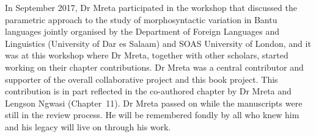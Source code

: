 \documentclass[output=paper]{langscibook}
\begin{document}
In  {September 2017}, Dr Mreta participated in the workshop that discussed the parametric approach to the study of morphosyntactic variation in Bantu languages jointly organised by the Department of Foreign Languages and Linguistics (University of Dar es Salaam) and SOAS University of London, and it was at this workshop where Dr Mreta, together with other scholars, started working on their chapter contributions. Dr Mreta was a central contributor and supporter of the overall collaborative project and this book project. This contribution is in part reflected in the co-authored chapter by Dr Mreta and Lengson Ngwasi (Chapter~11). Dr Mreta passed on while the manuscripts were still in the review process. He will be remembered fondly by all who knew him and his legacy will live on through his work.

\printbibliography[heading=subbibliography,notkeyword=this]
\end{document}
